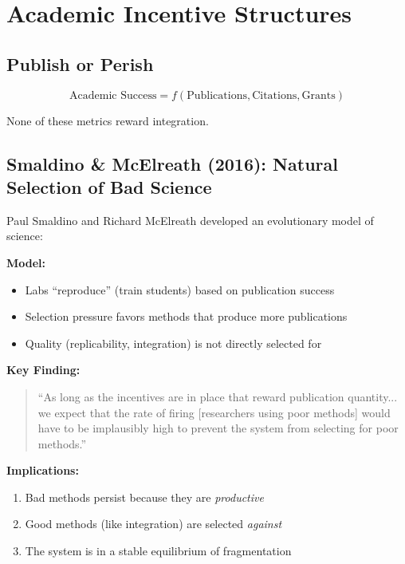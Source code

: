 
\section{Academic Incentive Structures}
\label{sec:meta-incentives}

\subsection{Publish or Perish}

\begin{tcolorbox}[colback=red!5!white, colframe=red!75!black,
    title=The Fundamental Distortion]
\begin{equation}
\text{Academic Success} = f(\text{Publications}, \text{Citations}, \text{Grants})
\end{equation}

None of these metrics reward integration.
\end{tcolorbox}

\subsection{Smaldino \& McElreath (2016): Natural Selection of Bad Science}

Paul Smaldino and Richard McElreath developed an evolutionary model of science:

\textbf{Model:}
\begin{itemize}
\item Labs ``reproduce'' (train students) based on publication success
\item Selection pressure favors methods that produce more publications
\item Quality (replicability, integration) is not directly selected for
\end{itemize}

\textbf{Key Finding:}
\begin{quote}
``As long as the incentives are in place that reward publication quantity... we expect that the rate of firing [researchers using poor methods] would have to be implausibly high to prevent the system from selecting for poor methods.''
\end{quote}

\textbf{Implications:}
\begin{enumerate}
\item Bad methods persist because they are \textit{productive}
\item Good methods (like integration) are selected \textit{against}
\item The system is in a stable equilibrium of fragmentation
\end{enumerate}

